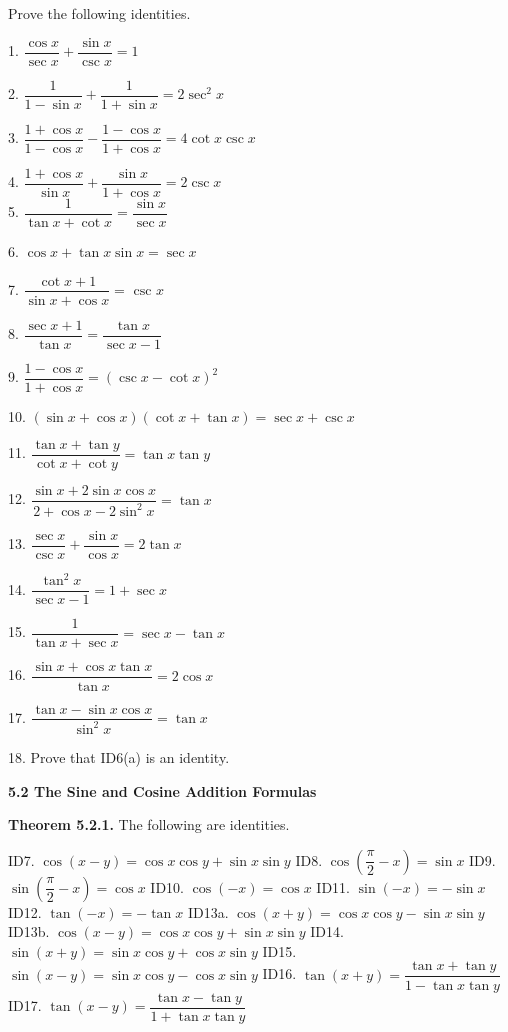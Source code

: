 Prove the following identities.\nl

1. $\dfrac{\cos x}{\sec x} + \dfrac{\sin x}{\csc x} = 1$\nl

2. $\dfrac{1}{1 - \sin x} + \dfrac{1}{1 + \sin x} = 2\sec ^{2} x$\nl

3. $\dfrac{1 + \cos x}{1 - \cos x} - \dfrac{1 - \cos x}{1 + \cos x} = 4\cot x \csc x$\nl

4. $\dfrac{1 + \cos x}{\sin x} + \dfrac{\sin x}{1 + \cos x} = 2 \csc x$\\

5. $\dfrac{1}{\tan x + \cot x } = \dfrac{\sin x}{\sec x}$\nl

6. $\cos x + \tan x \sin x = \sec x$\nl

7. $\dfrac{\cot x + 1}{\sin x + \cos x}= \text{~csc~} x$\nl

8. $\dfrac{\sec x + 1}{\tan x} = \dfrac{\tan x}{\sec x - 1}$\nl

9. $\dfrac{1 - \cos x}{1 + \cos x} = (\csc x - \cot x)^{2}$\nl

10. $(\sin x + \cos x)(\cot x + \tan x) = \sec x + \csc x$\nl

11. $\dfrac{\tan x + \tan y}{\cot x + \cot y} = \tan x \tan y$\nl

12. $\dfrac{\sin x + 2\sin x \cos x}{2 + \cos x -2\sin^{2} x} = \tan x$\nl

13. $\dfrac{\sec x}{\csc x} + \dfrac{\sin x}{\cos x}  = 2\tan x$\nl

14. $\dfrac{\tan^{2}x}{\sec x - 1} = 1 + \sec x$\nl

15. $\dfrac{1}{\tan x + \sec x} = \sec x- \tan x$\nl

16. $\dfrac{\sin x + \cos x \tan x}{\tan x} = 2\cos x$\nl

17. $\dfrac{\tan x - \sin x \cos x}{\sin^{2}x} = \tan x$\nl

18. Prove that ID6(a) is an identity.

\newpage
\textbf{5.2 The Sine and Cosine Addition Formulas}\nl

\textbf{Theorem 5.2.1.} The following are identities. \nl

ID7. $\cos(x - y) = \cos x\cos y + \sin x \sin y $\nl
ID8. $\cos(\dfrac{\pi}{2} - x) = \sin x$\nl
ID9. $\sin(\dfrac{\pi}{2} - x) = \cos x $\nl
ID10. $\cos(-x) = \cos x $\nl
ID11. $\sin(-x) = -\sin x$\nl
ID12. $\tan(-x) = -\tan x$\nl
ID13a. $\cos(x+y) = \cos x \cos y - \sin x \sin y $\nl
ID13b. $\cos(x-y) = \cos x \cos y + \sin x \sin y $\nl
ID14. $\sin(x+y) = \sin x \cos y + \cos x \sin y$\nl
ID15. $\sin(x-y) = \sin x \cos y - \cos x \sin y$\nl
ID16. $\tan(x + y) = \dfrac{\tan x + \tan y}{1 - \tan x \tan y}$\nl
ID17. $\tan(x - y) = \dfrac{\tan x - \tan y}{1 + \tan x \tan y} $\nl


